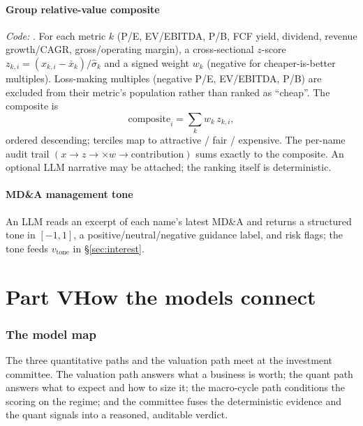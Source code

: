 \documentclass[11pt]{article}
\begin{document}
\subsection{Group relative-value composite}
\label{sec:group}
\emph{Code:} . For each metric $k$ (P/E,
EV/EBITDA, P/B, FCF yield, dividend, revenue growth/CAGR, gross/operating margin),
a cross-sectional $z$-score $z_{k,i}=(x_{k,i}-\bar x_k)/\hat\sigma_k$ and a signed
weight $w_k$ (negative for cheaper-is-better multiples). Loss-making multiples
(negative P/E, EV/EBITDA, P/B) are excluded from their metric's population rather
than ranked as ``cheap''. The composite is
\begin{equation}
  \text{composite}_i=\sum_k w_k\,z_{k,i},
\end{equation}
ordered descending; terciles map to attractive / fair / expensive. The per-name
audit trail $(x\to z\to \times w\to\text{contribution})$ sums exactly to the
composite. An optional LLM narrative may be attached; the ranking itself is
deterministic.

\subsection{MD\&A management tone}
An LLM reads an excerpt of each name's latest MD\&A and returns a structured tone
in $[-1,1]$, a positive/neutral/negative guidance label, and risk flags; the tone
feeds $v_{\text{tone}}$ in \S\ref{sec:interest}.

\part*{Part V\quad How the models connect}

\section{The model map}
The three quantitative paths and the valuation path meet at the investment
committee. The valuation path answers what a business is worth; the quant path
answers what to expect and how to size it; the macro-cycle path conditions the
scoring on the regime; and the committee fuses the deterministic evidence and the
quant signals into a reasoned, auditable verdict.
\end{document}
